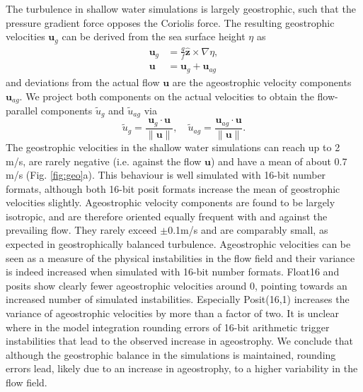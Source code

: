 The turbulence in shallow water simulations is largely geostrophic, such that the pressure gradient force opposes the Coriolis force.
The resulting geostrophic velocities $\mathbf{u}_g$ can be derived from the sea surface height $\eta$ as
\begin{subequations}
\begin{align}
\mathbf{u}_g &= \frac{g}{f}\hat{\mathbf{z}} \times \nabla \eta, \\
\mathbf{u} &= \mathbf{u}_{g} + \mathbf{u}_{ag}
\end{align}
\label{eq:geo}%
\end{subequations}
and deviations from the actual flow $\mathbf{u}$ are the ageostrophic velocity components $\mathbf{u}_{ag}$. We project both
components on the actual velocities to obtain the flow-parallel components $\tilde{u}_{g}$ and $\tilde{u}_{ag}$ via
\begin{equation}
\tilde{u}_g = \frac{\mathbf{u}_g \cdot \mathbf{u}}{\| \mathbf{u} \|},
\quad \tilde{u}_{ag} = \frac{\mathbf{u}_{ag} \cdot \mathbf{u}}{\| \mathbf{u} \|}.
\label{eq:parallel}%
\end{equation}
The geostrophic velocities in the shallow water simulations can reach up to 2 m/s, are rarely negative (i.e. against the flow
$\mathbf{u}$) and have a mean of about 0.7 m/s (Fig. \ref{fig:geo}a). This behaviour is well simulated with 16-bit number
formats, although both 16-bit posit formats increase the mean of geostrophic velocities slightly. Ageostrophic velocity components
are found to be largely isotropic, and are therefore oriented equally frequent with and against the prevailing flow. They rarely exceed
$\pm$0.1m/s and are comparably small, as expected in geostrophically balanced turbulence. Ageostrophic velocities can be seen
as a measure of the physical instabilities in the flow field and their variance is indeed increased when simulated with 16-bit number
formats. Float16 and posits show clearly fewer ageostrophic velocities around 0, pointing towards an increased number of simulated
instabilities. Especially Posit(16,1) increases the variance of ageostrophic velocities by more than a factor of two. It is unclear where
in the model integration rounding errors of 16-bit arithmetic trigger instabilities that lead to the observed increase in ageostrophy.
We conclude that although the geostrophic balance in the simulations is maintained, rounding errors lead, likely due to an increase
in ageostrophy, to a higher variability in the flow field.

